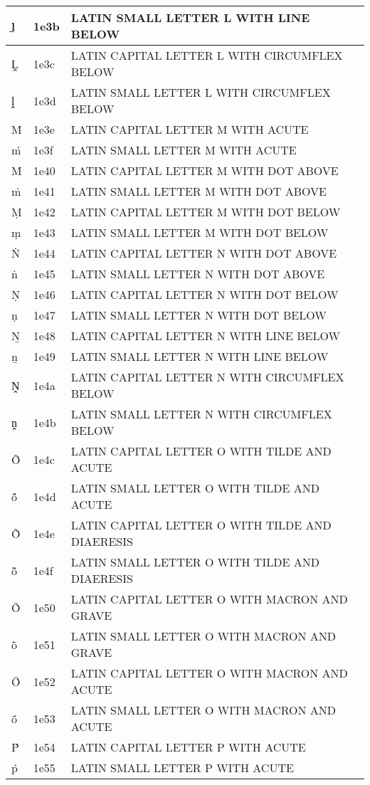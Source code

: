 \documentclass[12pt,letterpaper,openany]{book}
\begin{document}
\begin{center}
\begin{supertabular}{|m{0.25in}|m{0.5in}|m{4in}|}
ḻ & 1e3b & LATIN SMALL LETTER L WITH LINE BELOW\\\hline
Ḽ & 1e3c & LATIN CAPITAL LETTER L WITH CIRCUMFLEX BELOW\\\hline
ḽ & 1e3d & LATIN SMALL LETTER L WITH CIRCUMFLEX BELOW\\\hline
Ḿ & 1e3e & LATIN CAPITAL LETTER M WITH ACUTE\\\hline
ḿ & 1e3f & LATIN SMALL LETTER M WITH ACUTE\\\hline
Ṁ & 1e40 & LATIN CAPITAL LETTER M WITH DOT ABOVE\\\hline
ṁ & 1e41 & LATIN SMALL LETTER M WITH DOT ABOVE\\\hline
Ṃ & 1e42 & LATIN CAPITAL LETTER M WITH DOT BELOW\\\hline
ṃ & 1e43 & LATIN SMALL LETTER M WITH DOT BELOW\\\hline
Ṅ & 1e44 & LATIN CAPITAL LETTER N WITH DOT ABOVE\\\hline
ṅ & 1e45 & LATIN SMALL LETTER N WITH DOT ABOVE\\\hline
Ṇ & 1e46 & LATIN CAPITAL LETTER N WITH DOT BELOW\\\hline
ṇ & 1e47 & LATIN SMALL LETTER N WITH DOT BELOW\\\hline
Ṉ & 1e48 & LATIN CAPITAL LETTER N WITH LINE BELOW\\\hline
ṉ & 1e49 & LATIN SMALL LETTER N WITH LINE BELOW\\\hline
Ṋ & 1e4a & LATIN CAPITAL LETTER N WITH CIRCUMFLEX BELOW\\\hline
ṋ & 1e4b & LATIN SMALL LETTER N WITH CIRCUMFLEX BELOW\\\hline
Ṍ & 1e4c & LATIN CAPITAL LETTER O WITH TILDE AND ACUTE\\\hline
ṍ & 1e4d & LATIN SMALL LETTER O WITH TILDE AND ACUTE\\\hline
Ṏ & 1e4e & LATIN CAPITAL LETTER O WITH TILDE AND DIAERESIS\\\hline
ṏ & 1e4f & LATIN SMALL LETTER O WITH TILDE AND DIAERESIS\\\hline
Ṑ & 1e50 & LATIN CAPITAL LETTER O WITH MACRON AND GRAVE\\\hline
ṑ & 1e51 & LATIN SMALL LETTER O WITH MACRON AND GRAVE\\\hline
Ṓ & 1e52 & LATIN CAPITAL LETTER O WITH MACRON AND ACUTE\\\hline
ṓ & 1e53 & LATIN SMALL LETTER O WITH MACRON AND ACUTE\\\hline
Ṕ & 1e54 & LATIN CAPITAL LETTER P WITH ACUTE\\\hline
ṕ & 1e55 & LATIN SMALL LETTER P WITH ACUTE\\\hline

\end{supertabular}
\end{center}
\end{document}
